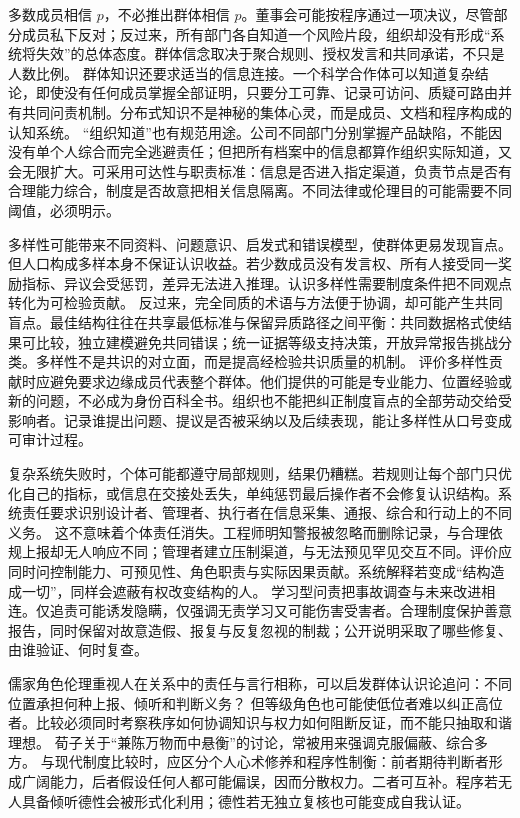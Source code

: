 多数成员相信 \(p\)，不必推出群体相信 \(p\)。董事会可能按程序通过一项决议，尽管部分成员私下反对；反过来，所有部门各自知道一个风险片段，组织却没有形成“系统将失效”的总体态度。群体信念取决于聚合规则、授权发言和共同承诺，不只是人数比例。 群体知识还要求适当的信息连接。一个科学合作体可以知道复杂结论，即使没有任何成员掌握全部证明，只要分工可靠、记录可访问、质疑可路由并有共同问责机制。分布式知识不是神秘的集体心灵，而是成员、文档和程序构成的认知系统。\parencite{goldman1999} “组织知道”也有规范用途。公司不同部门分别掌握产品缺陷，不能因没有单个人综合而完全逃避责任；但把所有档案中的信息都算作组织实际知道，又会无限扩大。可采用可达性与职责标准：信息是否进入指定渠道，负责节点是否有合理能力综合，制度是否故意把相关信息隔离。不同法律或伦理目的可能需要不同阈值，必须明示。

多样性可能带来不同资料、问题意识、启发式和错误模型，使群体更易发现盲点。\parencite{longino1990} 但人口构成多样本身不保证认识收益。若少数成员没有发言权、所有人接受同一奖励指标、异议会受惩罚，差异无法进入推理。认识多样性需要制度条件把不同观点转化为可检验贡献。 反过来，完全同质的术语与方法便于协调，却可能产生共同盲点。最佳结构往往在共享最低标准与保留异质路径之间平衡：共同数据格式使结果可比较，独立建模避免共同错误；统一证据等级支持决策，开放异常报告挑战分类。多样性不是共识的对立面，而是提高经检验共识质量的机制。 评价多样性贡献时应避免要求边缘成员代表整个群体。他们提供的可能是专业能力、位置经验或新的问题，不必成为身份百科全书。组织也不能把纠正制度盲点的全部劳动交给受影响者。记录谁提出问题、提议是否被采纳以及后续表现，能让多样性从口号变成可审计过程。

复杂系统失败时，个体可能都遵守局部规则，结果仍糟糕。若规则让每个部门只优化自己的指标，或信息在交接处丢失，单纯惩罚最后操作者不会修复认识结构。系统责任要求识别设计者、管理者、执行者在信息采集、通报、综合和行动上的不同义务。 这不意味着个体责任消失。工程师明知警报被忽略而删除记录，与合理依规上报却无人响应不同；管理者建立压制渠道，与无法预见罕见交互不同。评价应同时问控制能力、可预见性、角色职责与实际因果贡献。系统解释若变成“结构造成一切”，同样会遮蔽有权改变结构的人。 学习型问责把事故调查与未来改进相连。仅追责可能诱发隐瞒，仅强调无责学习又可能伤害受害者。合理制度保护善意报告，同时保留对故意造假、报复与反复忽视的制裁；公开说明采取了哪些修复、由谁验证、何时复查。

儒家角色伦理重视人在关系中的责任与言行相称，可以启发群体认识论追问：不同位置承担何种上报、倾听和判断义务？\parencite{analects2003} 但等级角色也可能使低位者难以纠正高位者。比较必须同时考察秩序如何协调知识与权力如何阻断反证，而不能只抽取和谐理想。 荀子关于“兼陈万物而中悬衡”的讨论，常被用来强调克服偏蔽、综合多方。\parencite[chap.~21]{xunzi2014} 与现代制度比较时，应区分个人心术修养和程序性制衡：前者期待判断者形成广阔能力，后者假设任何人都可能偏误，因而分散权力。二者可互补。程序若无人具备倾听德性会被形式化利用；德性若无独立复核也可能变成自我认证。

